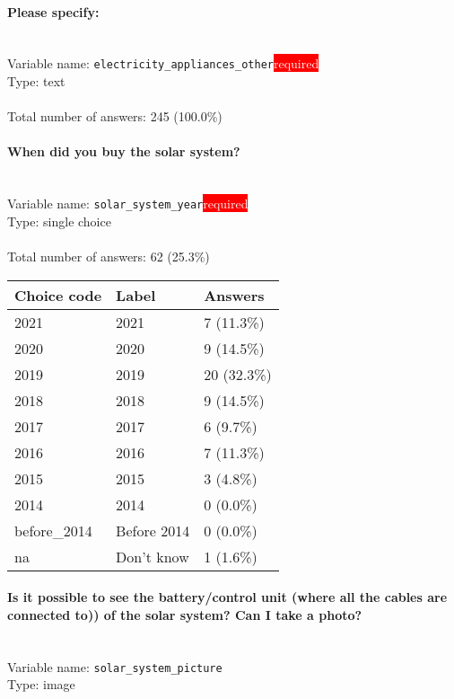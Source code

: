 \documentclass[11.5pt, a4paper]{scrartcl}
\begin{document}
\paragraph{Please specify:}
\  \\Variable name: \texttt{electricity\_appliances\_other}\hfill\colorbox{red}{\small{\textcolor{white}{required}}}\\
 Type: text\\
\\Total number of answers: 245 (100.0\%)
\\[0.2em]\paragraph{When did you buy the solar system?}
\  \\Variable name: \texttt{solar\_system\_year}\hfill\colorbox{red}{\small{\textcolor{white}{required}}}\\
 Type: single choice\\
\\Total number of answers: 62 (25.3\%)
\\[0.2em] \begin{tabular}{p{4cm}|p{8cm}|p{3cm}}
Choice code & Label & Answers \\
\hline
2021 & 2021& \cellcolor{color0}7 (11.3\%)\\
\cellcolor{mygray} 2020 & \cellcolor{mygray}2020 & \cellcolor{color0}9 (14.5\%)\\
2019 & 2019& \cellcolor{color1}20 (32.3\%)\\
\cellcolor{mygray} 2018 & \cellcolor{mygray}2018 & \cellcolor{color0}9 (14.5\%)\\
2017 & 2017& \cellcolor{color0}6 (9.7\%)\\
\cellcolor{mygray} 2016 & \cellcolor{mygray}2016 & \cellcolor{color0}7 (11.3\%)\\
2015 & 2015& \cellcolor{color0}3 (4.8\%)\\
\cellcolor{mygray} 2014 & \cellcolor{mygray}2014 & \cellcolor{color0}0 (0.0\%)\\
before\_2014 & Before 2014& \cellcolor{color0}0 (0.0\%)\\
\cellcolor{mygray} na & \cellcolor{mygray}Don’t know & \cellcolor{color0}1 (1.6\%)\\
\end{tabular}
\paragraph{Is it possible to see the battery/control unit (where all the cables are connected to)) of the solar system? Can  I take a photo?}
\  \\Variable name: \texttt{solar\_system\_picture}\\
Type: image\\
\end{document}
